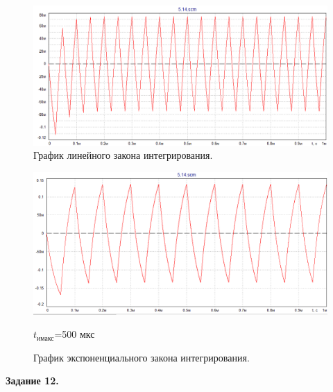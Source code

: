 \documentclass[a4paper,14pt]{extarticle}
\begin{document}
    \begin{figure}[h!]
        \begin{center}
            \includegraphics[scale=0.5]{28.png}
        \end{center}
        \vspace{-0.7cm}
        \caption{График линейного закона интегрирования.}
    \end{figure}

    \begin{figure}
        \begin{center}
            \includegraphics[scale=0.5]{29.png}
        \end{center}
        \vspace{-0.7cm}
        \caption{График экспоненциального закона интегрирования.}
        $t_\text{имакс}$=500 мкс
    \end{figure}
    

    \newpage
    \begin{center}
        \textbf{Задание 12.}
    \end{center}
\end{document}
